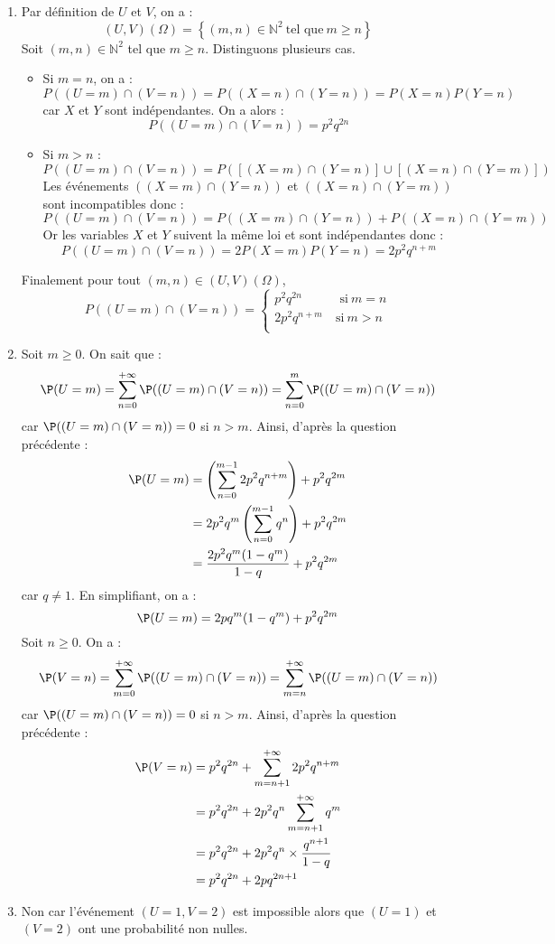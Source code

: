 \documentclass[a4paper,twoside,french,11pt]{VcCours}
\begin{document}
\begin{enumerate}
\item Par définition de $U$ et $V$, on a :
$$(U,V)(\Omega)=\left\lbrace (m,n)\in\mathbb{N}^2\:\text{tel que}\: m\geqslant n\right\rbrace$$
Soit $(m,n)\in\mathbb{N}^2$ tel que $m\geqslant n$. Distinguons plusieurs cas.
\begin{itemize}
\item Si $m=n$, on a :
$$P((U=m)\cap(V=n))=P((X=n)\cap(Y=n))=P(X=n)P(Y=n)$$
car $X$ et $Y$ sont indépendantes. On a alors :
$$P((U=m)\cap(V=n))=p^2q^{2n}$$
\item Si $m>n$ :
$$P((U=m)\cap(V=n))=P(\left[  (X=m)\cap(Y=n)\right]  \cup \left[  (X=n)\cap(Y=m)\right] )$$
Les événements $\left( (X=m)\cap(Y=n)\right)$ et  $\left( (X=n)\cap(Y=m)\right)$ sont incompatibles donc :
$$P((U=m)\cap(V=n))=P\left( (X=m)\cap(Y=n)\right)+P\left( (X=n)\cap(Y=m)\right)$$
Or les variables $X$ et $Y$ suivent la même loi et sont indépendantes donc :
$$P((U=m)\cap (V=n))=2P (X=m)P(Y=n)=2p^2q^{n+m}$$
\end{itemize} 
Finalement pour tout $(m,n) \in (U,V)(\Omega)$,
$$P((U=m)\cap (V=n))=\left\lbrace 
\begin{array}{ll}
p^2q^{2n}&\:\text{ si}\: m=n\\
2p^2q^{n+m} &\:\text{si}\: m>n\\
\end{array}
\right.$$
\item Soit $m \geq 0$. On sait que :
$$ \P(U=m) = \sum_{n=0}^{+ \infty} \P((U=m)\cap (V=n)) = \sum_{n=0}^{m} \P((U=m)\cap (V=n))$$
car $\P((U=m)\cap (V=n))=0$ si $n>m$. Ainsi, d'après la question précédente :
\begin{align*}
 \P(U=m) & = \left(\sum_{n=0}^{m-1}  2p^2q^{n+m}\right) + p^2q^{2m}\\
 & = 2p^2 q^m \left(\sum_{n=0}^{m-1}  q^n \right) +  p^2q^{2m}\\
 & = \dfrac{2p^2q^m (1-q^m)}{1-q} + p^2q^{2m}
 \end{align*}
 car $q \neq 1$. En simplifiant, on a :
 $$ \P(U=m) = 2pq^m (1-q^m) + p^2 q^{2m}$$
 Soit $n \geq 0$. On a :
$$ \P(V=n) = \sum_{m=0}^{+ \infty} \P((U=m)\cap (V=n)) = \sum_{m=n}^{+\infty} \P((U=m)\cap (V=n))$$
car $\P((U=m)\cap (V=n))=0$ si $n>m$. Ainsi, d'après la question précédente :
\begin{align*}
\P(V=n) & = p^2q^{2n} + \sum_{m=n+1}^{+\infty} 2p^2q^{n+m} \\
& = p^2q^{2n} + 2p^2 q^n \sum_{m=n+1}^{+\infty} q^m \\
& =  p^2q^{2n} + 2p^2 q^n \times \dfrac{q^{n+1}}{1-q} \\
& = p^2q^{2n} + 2pq^{2n+1}
\end{align*}
\item Non car l'événement $(U=1,V=2)$ est impossible alors que $(U=1)$ et $(V=2)$ ont une probabilité non nulles.
\end{enumerate}
\end{document}
